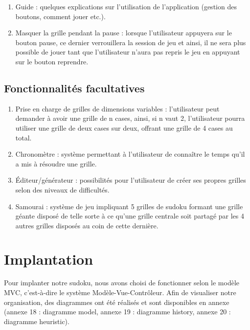 \begin{enumerate}
  \item Guide : quelques explications sur l'utilisation de l'application 
  (gestion des boutons, comment jouer etc.).\\
 
  \item Masquer la grille pendant la pause : lorsque l'utilisateur appuyera sur le bouton pause, 
  ce dernier verrouillera la session de jeu et ainsi, 
  il ne sera plus possible de jouer tant que l'utilisateur 
  n'aura pas repris le jeu en appuyant sur le bouton reprendre. \\
\end{enumerate}
 
\subsection{Fonctionnalités facultatives}

\begin{enumerate}
  \item Prise en charge de grilles de dimensions variables : 
  l'utilisateur peut demander à avoir une grille de n cases, ainsi,
  si n vaut 2, l'utilisateur pourra utiliser une grille de deux cases sur deux, 
  offrant une grille de 4 cases au total.   \\

 \item Chronomètre : système permettant à l'utilisateur de connaître 
 le temps qu'il a mis à résoudre une grille.  \\
 
 \item Éditeur/générateur : possibilités pour l'utilisateur 
 de créer ses propres grilles selon des niveaux de difficultés. \\
 
 \item Samourai : système de jeu impliquant 5 grilles de sudoku formant une grille géante 
 disposé de telle sorte à ce qu'une grille centrale soit partagé 
 par les 4 autres grilles disposés au coin de cette dernière.  \\
\end{enumerate}

\section{Implantation}
Pour implanter notre sudoku, nous avons choisi de fonctionner selon le modèle MVC, 
c'est-à-dire le système Modèle-Vue-Contrôleur. Afin de visualiser notre organisation, 
des diagrammes ont été réalisés et sont disponibles en annexe 
(annexe 18 : diagramme model,
annexe 19 : diagramme history,
annexe 20 : diagramme heuristic).

